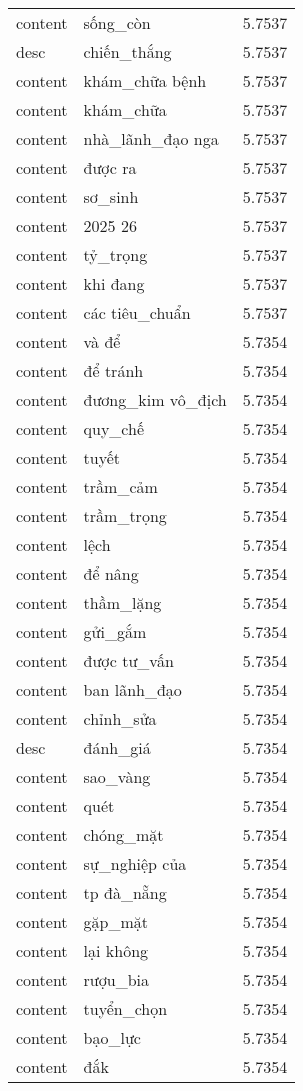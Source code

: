 \documentclass{article}
\begin{document}
\begin{tabular}{lll}
content & sống\_còn & 5.7537\\
desc & chiến\_thắng & 5.7537\\
content & khám\_chữa bệnh & 5.7537\\
content & khám\_chữa & 5.7537\\
content & nhà\_lãnh\_đạo nga & 5.7537\\
content & được ra & 5.7537\\
content & sơ\_sinh & 5.7537\\
content & 2025 26 & 5.7537\\
content & tỷ\_trọng & 5.7537\\
content & khi đang & 5.7537\\
content & các tiêu\_chuẩn & 5.7537\\
content & và để & 5.7354\\
content & để tránh & 5.7354\\
content & đương\_kim vô\_địch & 5.7354\\
content & quy\_chế & 5.7354\\
content & tuyết & 5.7354\\
content & trầm\_cảm & 5.7354\\
content & trầm\_trọng & 5.7354\\
content & lệch & 5.7354\\
content & để nâng & 5.7354\\
content & thầm\_lặng & 5.7354\\
content & gửi\_gắm & 5.7354\\
content & được tư\_vấn & 5.7354\\
content & ban lãnh\_đạo & 5.7354\\
content & chỉnh\_sửa & 5.7354\\
desc & đánh\_giá & 5.7354\\
content & sao\_vàng & 5.7354\\
content & quét & 5.7354\\
content & chóng\_mặt & 5.7354\\
content & sự\_nghiệp của & 5.7354\\
content & tp đà\_nẵng & 5.7354\\
content & gặp\_mặt & 5.7354\\
content & lại không & 5.7354\\
content & rượu\_bia & 5.7354\\
content & tuyển\_chọn & 5.7354\\
content & bạo\_lực & 5.7354\\
content & đắk & 5.7354\\

\end{tabular}
\end{document}
